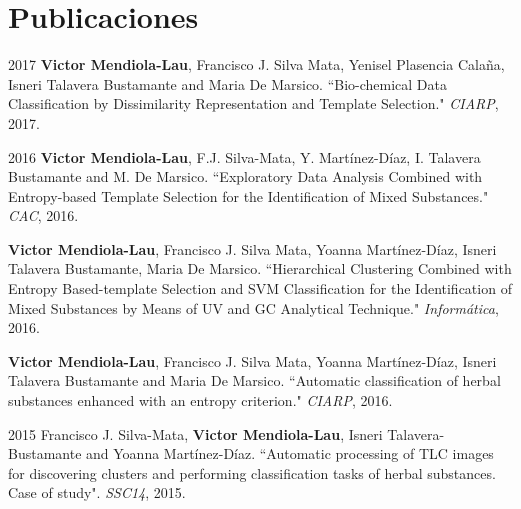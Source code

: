 \documentclass[]{friggeri-cv}
\begin{document}
\section{Publicaciones}
\begin{paperlist}
  \paperentry
    {2017}
    {}
    {}
    {
		\textbf{Victor Mendiola-Lau}, Francisco J. Silva Mata, Yenisel Plasencia Calaña, Isneri Talavera Bustamante and Maria De Marsico. ``Bio-chemical Data Classification by Dissimilarity Representation and Template Selection." \emph{CIARP}, 2017.
    }
\end{paperlist}

\vspace{0.5cm}

\begin{paperlist}
  \paperentry
    {2016}
    {}
    {}
    {
		\textbf{Victor Mendiola-Lau}, F.J. Silva-Mata, Y. Martínez-Díaz, I. Talavera Bustamante and M. De Marsico. ``Exploratory Data Analysis Combined with Entropy-based Template Selection for the Identification of Mixed Substances."	 \emph{CAC}, 2016.
    }
\end{paperlist}

\begin{paperlist}
  \paperentry
    {}
    {}
    {}
    {
		\textbf{Victor Mendiola-Lau}, Francisco J. Silva Mata, Yoanna Martínez-Díaz, Isneri Talavera Bustamante, Maria De Marsico. ``Hierarchical Clustering Combined with Entropy Based-template Selection and SVM Classification for the Identification of Mixed Substances by Means of UV and GC Analytical Technique." \emph{Informática}, 2016.
    }
\end{paperlist}

\begin{paperlist}
  \paperentry
    {}
    {}
    {}
    {
		\textbf{Victor Mendiola-Lau}, Francisco J. Silva Mata, Yoanna Martínez-Díaz, Isneri Talavera Bustamante and Maria De Marsico. ``Automatic classification of herbal substances enhanced with an entropy criterion." \emph{CIARP}, 2016.
    }
\end{paperlist}

\vspace{0.5cm}

\begin{paperlist}
  \paperentry
    {2015}
    {}
    {}
    {
		Francisco J. Silva-Mata, \textbf{Victor Mendiola-Lau}, Isneri Talavera-Bustamante and Yoanna Martínez-Díaz. ``Automatic processing of TLC images for discovering clusters and performing classification tasks of herbal substances. Case of study". \emph{SSC14}, 2015.
    }
\end{paperlist}
\end{document}
